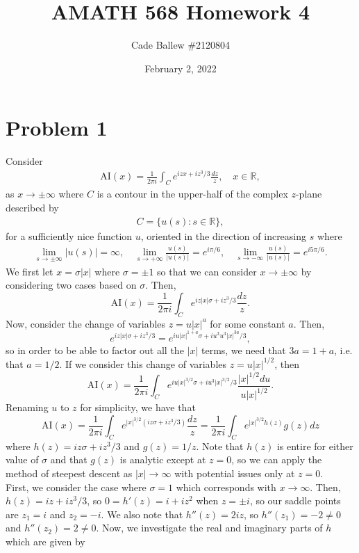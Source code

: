 \documentclass{article}
\title{AMATH 568 Homework 4}
\author{Cade Ballew \#2120804}
\date{February 2, 2022}
\begin{document}
	
\maketitle
	
\section{Problem 1}
Consider \begin{align*}
    \mathrm{AI}(x) = \frac{1}{2 \pi i} \int_C e^{i z x + i z^3/3} \frac{d z}{z}, \quad x \in \mathbb R,
  \end{align*}
  as $x \to \pm \infty$ where $C$ is a contour in the upper-half of the complex $z$-plane described by
  \begin{align*}
    C = \{ u(s) : s \in \mathbb R\},
  \end{align*}
  for a sufficiently nice function $u$, oriented in the direction of increasing $s$ where
  \begin{align*}
  \lim_{s \to \pm \infty} |u(s)| = \infty, \quad   \lim_{s \to + \infty} \frac{u(s)}{|u(s)|} = e^{i \pi/6}, \quad \lim_{s \to - \infty} \frac{u(s)}{|u(s)|} = e^{i 5\pi/6}.
  \end{align*}
We first let $x=\sigma|x|$ where $\sigma=\pm1$ so that we can consider $x \to \pm \infty$ by considering two cases based on $\sigma$. Then,
\[
\mathrm{AI}(x) = \frac{1}{2 \pi i} \int_C e^{i z |x|\sigma + i z^3/3} \frac{d z}{z}.
\]
Now, consider the change of variables $z=u|x|^a$ for some constant $a$. Then,
\[
e^{i z |x|\sigma + i z^3/3}=e^{iu|x|^{1+a}\sigma+iu^3u^3|x|^{3a}/3},
\]
so in order to be able to factor out all the $|x|$ terms, we need that $3a=1+a$, i.e. that $a=1/2$. If we consider this change of variables $z=u|x|^{1/2}$, then
\[
\mathrm{AI}(x) = \frac{1}{2 \pi i} \int_C e^{i  u|x|^{3/2}\sigma + i u^3|x|^{3/2}/3} \frac{|x|^{1/2}du}{u|x|^{1/2}}.
\]
Renaming $u$ to $z$ for simplicity, we have that 
\[
\mathrm{AI}(x) = \frac{1}{2 \pi i} \int_C e^{  |x|^{3/2}(iz\sigma + iz^3/3)} \frac{dz}{z}=\frac{1}{2 \pi i} \int_C e^{|x|^{3/2}h(z)}g(z)dz
\]
where $h(z)=iz\sigma + iz^3/3$ and $g(z)=1/z$. Note that $h(z)$ is entire for either value of $\sigma$ and that $g(z)$ is analytic except at $z=0$, so we can apply the method of steepest descent as $|x|\to\infty$ with potential issues only at $z=0$. \\
First, we consider the case where $\sigma=1$ which corresponds with $x\to\infty$. Then, $h(z)=iz+iz^3/3$, so $0=h'(z)=i+iz^2$ when $z=\pm i$, so our saddle points are $z_1=i$ and $z_2=-i$. We also note that $h''(z)=2iz$, so $h''(z_1)=-2\neq0$ and $h''(z_2)=2\neq0$. Now, we investigate the real and imaginary parts of $h$ which are given by 
\end{document}
